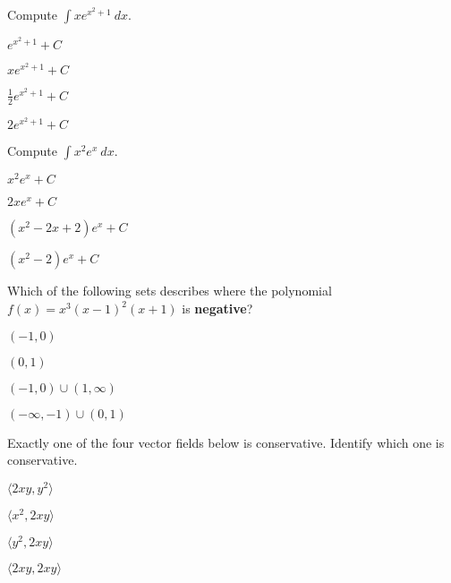 \begin{readinessAssuranceTest}
\setcounter{enumi}{10}


\item Compute \(\int x e^{x^2+1}\ dx\).

\begin{multicols}{4}
\begin{readinessAssuranceTestChoices}
\item \(e^{x^2+1}+C\)
\item \(xe^{x^2+1}+C\)
\item \(\frac{1}{2} e^{x^2+1}+C\) %
\item \(2 e^{x^2+1}+C\) 
\end{readinessAssuranceTestChoices}
\end{multicols}

\item Compute \(\int x^2e^x\ dx\).

\begin{multicols}{4}
\begin{readinessAssuranceTestChoices}
\item \(x^2e^x+C\)
\item \( 2xe^{x}+C\)
\item \((x^2-2x+2)e^x+C\) %
\item \( (x^2-2)e^x+C\)
\end{readinessAssuranceTestChoices}
\end{multicols}

\item Which of the following sets describes where the polynomial \(f(x)=x^3(x-1)^2(x+1)\) is \textbf{negative}?
\begin{multicols}{4}
\begin{readinessAssuranceTestChoices}
\item \((-1,0)\) %
\item \((0,1)\)
\item \((-1,0) \cup (1,\infty) \)
\item \((-\infty,-1) \cup (0,1) \)
\end{readinessAssuranceTestChoices}
\end{multicols}

\item Exactly one of the four vector fields below is conservative.  Identify which one is conservative.
\begin{multicols}{4}
\begin{readinessAssuranceTestChoices}
\item \(\langle 2xy,y^2\rangle\)
\item \(\langle x^2,2xy\rangle\)
\item \(\langle y^2,2xy\rangle\) %
\item \(\langle 2xy,2xy\rangle\)
\end{readinessAssuranceTestChoices}
\end{multicols}


\end{readinessAssuranceTest}
